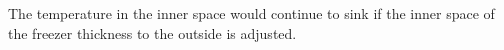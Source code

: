 The temperature in the inner space would continue to sink if the inner space of the freezer thickness to the outside is adjusted.
